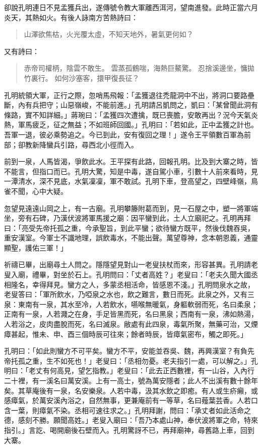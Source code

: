 卻說孔明連日不見孟獲兵出，遂傳號令教大軍離西洱河，望南進發。此時正當六月炎天，其熱如火。有後人詠南方苦熱詩曰：

\begin{quote}
山澤欲焦枯，火光覆太虛，不知天地外，暑氣更何如？
\end{quote}

又有詩曰：

\begin{quote}
赤帝司權柄，陰雲不敢生。
雲蒸孤鶴喘，海熱巨鰲驚。
忍捨溪邊坐，慵拋竹裏行。
如何沙塞客，擐甲復長征？
\end{quote}

孔明統領大軍，正行之際，忽哨馬飛報：「孟獲退往禿龍洞中不出，將洞口要路壘斷，內有兵把守；山惡嶺峻，不能前進。」孔明請呂凱問之，凱曰：「某曾聞此洞有條路，實不知詳細。」蔣琬曰：「孟獲四次遭擒，既已喪膽，安敢再出？況今天氣炎熱，軍馬疲乏，征之無益；不如班師回國。」孔明曰：「若如此，正中孟獲之計也。吾軍一退，彼必乘勢追之。今已到此，安有復回之理！」遂令王平領數百軍為前部；卻教新降蠻兵引路，尋西北小徑而入。

前到一泉，人馬皆渴，爭飲此水。王平探有此路，回報孔明。比及到大寨之時，皆不能言，但指口而已。孔明大驚，知是中毒，遂自駕小車，引數十人前來看時，見一潭清水，深不見底，水氣凜凜，軍不敢試。孔明下車，登高望之，四壁峰嶺，鳥雀不聞，心中大疑。

忽望見遠遠山岡之上，有一古廟。孔明攀籐附葛而到，見一石屋之中，塑一將軍端坐，旁有石碑，乃漢伏波將軍馬援之廟：因平蠻到此，土人立廟祀之。孔明再拜曰：「亮受先帝托孤之重，今承聖旨，到此平蠻；欲待蠻方既平，然後伐魏吞吳，重安漢室。今軍士不識地理，誤飲毒水，不能出聲。萬望尊神，念本朝恩義，通靈顯聖，護佑三軍！」

祈禱已畢，出廟尋土人問之。隱隱望見對山一老叟扶杖而來，形容甚異。孔明請老叟入廟，禮畢，對坐於石上。孔明問曰：「丈者高姓？」老叟曰：「老夫久聞大國丞相隆名，幸得拜見。蠻方之人，多蒙丞相活命，皆感恩不淺。」孔明問泉水之故，老叟答曰：「軍所飲水，乃啞泉之水也，飲之難言，數日而死。此泉之外，又有三泉：東南有一泉，其水至冷，人若飲水，嚥喉無暖氣，身軀軟弱而死，名曰柔泉；正南有一泉，人若濺之在身，手足皆黑而死，名曰黑泉；西南有一泉，沸如熱湯，人若浴之，皮肉盡脫而死，名曰滅泉。敝處有此四泉，毒氣所聚，無藥可治，又煙瘴甚起，惟未、申、酉三個時辰可往來；餘者時辰，皆瘴氣密布，觸之即死。」

孔明曰：「如此則蠻方不可平矣。蠻方不平，安能並吞吳、魏，再興漢室？有負先帝托孤之重，生不如死也！」老叟曰：「丞相勿憂。老夫指引一處，可以解之。」孔明曰：「老丈有何高見，望乞指教。」老叟曰：「此去正西數裡，有一山谷，入內行二十裡，有一溪名曰萬安溪。上有一高士，號為萬安隱者；此人不出溪有數十餘年矣。其草庵後有一泉，名安樂泉。人若中毒，汲其水飲之即癒。有人或生疥癩，或感瘴氣，於萬安溪內浴之，自然無事，更兼庵前有一等草，名曰薤葉芸香。人若口含一葉，則瘴氣不染。丞相可速往求之。」孔明拜謝，問曰：「承丈者如此活命之德，感刻不勝。願聞高姓。」老叟入廟曰：「吾乃本處山神，奉伏波將軍之命，特來指引。」言訖、喝開廟後石壁而入。孔明驚訝不已，再拜廟神，尋舊路上車，回到大寨。

